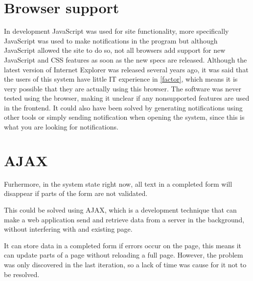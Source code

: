 \section{Browser support}
In development JavaScript was used for site functionality, more specifically JavaScript was used to make notifications in the program but although JavaScript allowed the site to do so, not all browsers add support for new JavaScript and CSS features as soon as the new specs are released.
Although the latest version of Internet Explorer was released several years ago, it was said that the users of this system have little IT experience in \cref{factor}, which means it is very possible that they are actually using this browser.
The software was never tested using the browser, making it unclear if any nonsupported features are used in the frontend.
It could also have been solved by generating notifications using other tools or simply sending notification when opening the system, since this is what you are looking for notifications.

\section{AJAX}

Furhermore, in the system state right now, all text in a completed form will disappear if parts of the form are not validated.

This could be solved using AJAX, which is a development technique that can make a web application send and retrieve data from a server in the background, without interfering with and existing page.

It can store data in a completed form if errors occur on the page, this means it can update parts of a page without reloading a full page.
However, the problem was only discovered in the last iteration, so a lack of time was cause for it not to be resolved.
